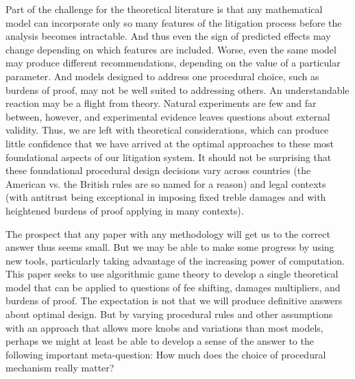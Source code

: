 \documentclass{article}
\begin{document}
Part of the challenge for the theoretical literature is that any mathematical model can incorporate only so many features of the litigation process before the analysis becomes intractable. And thus even the sign of predicted effects may change depending on which features are included. Worse, even the same model may produce different recommendations, depending on the value of a particular parameter. And models designed to address one procedural choice, such as burdens of proof, may not be well suited to addressing others. An understandable reaction may be a flight from theory. Natural experiments are few and far between, however, and experimental evidence leaves questions about external validity. Thus, we are left with theoretical considerations, which can produce little confidence that we have arrived at the optimal approaches to these most foundational aspects of our litigation system. It should not be surprising that these foundational procedural design decisions vary across countries (the American vs. the British rules are so named for a reason) and legal contexts (with antitrust being exceptional in imposing fixed treble damages and with heightened burdens of proof applying in many contexts).

The prospect that any paper with any methodology will get us to the correct answer thus seems small. But we may be able to make some progress by using new tools, particularly taking advantage of the increasing power of computation. This paper seeks to use algorithmic game theory to develop a single theoretical model that can be applied to questions of fee shifting, damages multipliers, and burdens of proof. The expectation is not that we will produce definitive answers about optimal design. But by varying procedural rules and other assumptions with an approach that allows more knobs and variations than most models, perhaps we might at least be able to develop a sense of the answer to the following important meta-question: How much does the choice of procedural mechanism really matter? 
\end{document}
